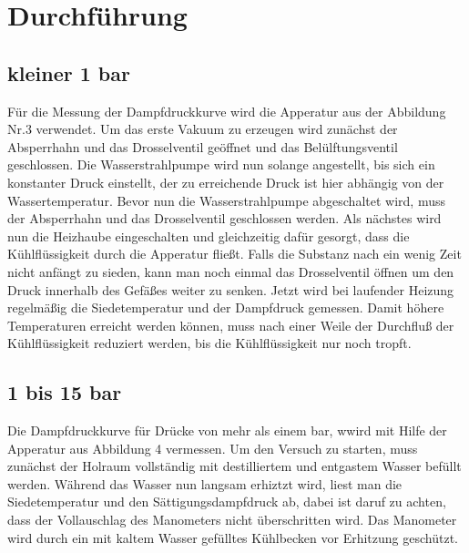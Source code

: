 \section{Durchführung}

\subsection{kleiner 1 bar}
Für die Messung der Dampfdruckkurve wird die Apperatur aus der Abbildung Nr.3 verwendet. Um das erste Vakuum zu erzeugen wird zunächst 
der Absperrhahn und das Drosselventil geöffnet und das Belülftungsventil geschlossen. Die Wasserstrahlpumpe wird nun solange angestellt, 
bis sich ein konstanter Druck einstellt, der zu erreichende Druck ist hier abhängig von der Wassertemperatur. Bevor nun die 
Wasserstrahlpumpe abgeschaltet wird, muss der Absperrhahn und das Drosselventil geschlossen werden. Als nächstes wird nun die Heizhaube 
eingeschalten und gleichzeitig dafür gesorgt, dass die Kühlflüssigkeit durch die Apperatur fließt. Falls die Substanz nach ein wenig Zeit 
nicht anfängt zu sieden, kann man noch einmal das Drosselventil öffnen um den Druck innerhalb des Gefäßes weiter zu senken. Jetzt wird 
bei laufender Heizung regelmäßig die Siedetemperatur und der Dampfdruck gemessen. Damit höhere Temperaturen erreicht werden können,
muss nach einer Weile der Durchfluß der Kühlflüssigkeit reduziert werden, bis die Kühlflüssigkeit nur noch tropft.


\subsection{1 bis 15 bar}

Die Dampfdruckkurve für Drücke von mehr als einem bar, wwird mit Hilfe  der Apperatur aus Abbildung 4 vermessen.
Um den Versuch zu starten, muss zunächst der Holraum vollständig mit destilliertem und entgastem Wasser befüllt werden.
Während das Wasser nun langsam erhiztzt wird, liest man die Siedetemperatur und den Sättigungsdampfdruck ab, dabei ist daruf zu 
achten, dass der Vollauschlag des Manometers nicht überschritten wird. Das Manometer wird durch ein mit kaltem Wasser gefülltes 
Kühlbecken vor Erhitzung geschützt.